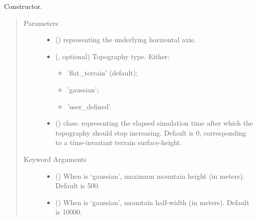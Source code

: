 \documentclass[letterpaper,10pt,english]{sphinxmanual}
\begin{document}
\begin{fulllineitems}
\begin{fulllineitems}
\label{\detokenize{api:grids.topography.Topography1d.__init__}}
Constructor.
\begin{quote}\begin{description}
\item[{Parameters}] \leavevmode\begin{itemize}
\item {} 
 () \textendash{} {\hyperref[\detokenize{api:grids.axis.Axis}]{}} representing the underlying horizontal axis.

\item {} 
 (, optional) \textendash{} 
Topography type. Either:
\begin{itemize}
\item {} 
’flat\_terrain’ (default);

\item {} 
’gaussian’;

\item {} 
’user\_defined’.

\end{itemize}


\item {} 
 () \textendash{} class: representing the elapsed simulation time after which the topography
should stop increasing. Default is 0, corresponding to a time-invariant terrain surface-height.

\end{itemize}

\item[{Keyword Arguments}] \leavevmode\begin{itemize}
\item {} 
 () \textendash{} When  is ‘gaussian’, maximum mountain height (in meters). Default is 500.

\item {} 
 () \textendash{} When  is ‘gaussian’, mountain half-width (in meters). Default is 10000.


\end{itemize}
\end{description}
\end{quote}
\end{fulllineitems}
\end{fulllineitems}
\end{document}
